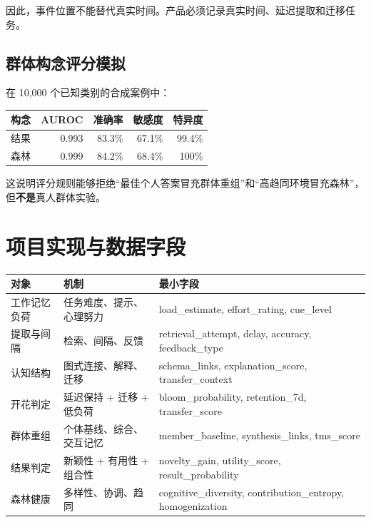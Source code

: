 \documentclass[UTF8,a4paper,11pt]{ctexart}
\begin{document}
因此，事件位置不能替代真实时间。产品必须记录真实时间、延迟提取和迁移任务。

\subsection{群体构念评分模拟}

在 10,000 个已知类别的合成案例中：

\begin{center}
\begin{tabular}{lrrrr}
\toprule
构念 & AUROC & 准确率 & 敏感度 & 特异度 \\
\midrule
结果 & 0.993 & 83.3\% & 67.1\% & 99.4\% \\
森林 & 0.999 & 84.2\% & 68.4\% & 100\% \\
\bottomrule
\end{tabular}
\end{center}

这说明评分规则能够拒绝“最佳个人答案冒充群体重组”和“高趋同环境冒充森林”，但\textbf{不是}真人群体实验。

\section{项目实现与数据字段}

\begin{center}
\begin{longtable}{@{}p{3.6cm}p{5.0cm}p{6.2cm}@{}}
\toprule
对象 & 机制 & 最小字段 \\
\midrule
工作记忆负荷 & 任务难度、提示、心理努力 & load\_estimate, effort\_rating, cue\_level \\
提取与间隔 & 检索、间隔、反馈 & retrieval\_attempt, delay, accuracy, feedback\_type \\
认知结构 & 图式连接、解释、迁移 & schema\_links, explanation\_score, transfer\_context \\
开花判定 & 延迟保持 + 迁移 + 低负荷 & bloom\_probability, retention\_7d, transfer\_score \\
群体重组 & 个体基线、综合、交互记忆 & member\_baseline, synthesis\_links, tms\_score \\
结果判定 & 新颖性 + 有用性 + 组合性 & novelty\_gain, utility\_score, result\_probability \\
森林健康 & 多样性、协调、趋同 & cognitive\_diversity, contribution\_entropy, homogenization \\
\bottomrule
\end{longtable}
\end{center}
\end{document}
